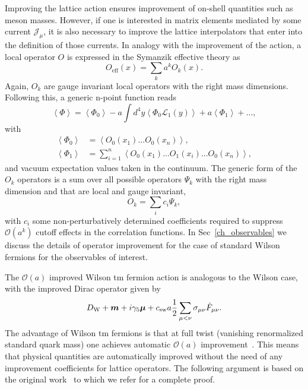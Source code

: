 Improving the lattice action ensures improvement of on-shell quantities such as meson masses. However, if one is interested in matrix elements mediated by some current $\mathcal{J}_{\mu}$, it is also necessary to improve the lattice interpolators that enter into the definition of those currents. In analogy with the improvement of the action, a local operator $O$ is expressed in the Symanzik effective theory as
\begin{equation}
O_{\textrm{eff}}(x)=\sum_ka^kO_k(x).
\end{equation}
Again, $O_k$ are gauge invariant local operators with the right mass dimensions. Following this, a generic n-point function reads
\begin{equation}
\label{ch_foundation:eq:Oimpr}
\left<\Phi\right>=\left<\Phi_0\right>-a\int d^4y\left<\Phi_0\mathcal{L}_1(y)\right>+a\left<\Phi_1\right>+...,
\end{equation}
with 
\begin{align}
\left<\Phi_0\right>&=\left<O_0(x_1)...O_0(x_n)\right>, \\
\left<\Phi_1\right>&=\sum_{i=1}^n\left<O_0(x_1)...O_1(x_i)...O_0(x_n)\right>,
\end{align}
and vacuum expectation values taken in the continuum. The generic form of the $O_k$ operators is a sum over all possible operators $\Psi_k$ with the right mass dimension and that are local and gauge invariant,
\begin{equation}
O_k=\sum_ic_i\Psi_k,
\end{equation}
with $c_i$ some non-perturbatively determined coefficients required to suppress $\mathcal{O}(a^k)$ cutoff effects in the correlation functions. In Sec~\ref{ch_observables} we discuss the details of operator improvement for the case of standard Wilson fermions for the observables of interest.

The $\mathcal{O}(a)$ improved Wilson tm fermion action is analogous to the Wilson case, with the improved Dirac operator given by 
\begin{equation}
D_{\textrm W}+\boldsymbol{m}+i\gamma_5\boldsymbol{\mu}+c_{\textrm{sw}}a\frac{1}{2}\sum_{\mu<\nu}\sigma_{\mu\nu}\hat{F}_{\mu\nu}.
\end{equation}
The advantage of Wilson tm fermions is that at full twist (vanishing renormalized standard quark mass) one achieves automatic $\mathcal{O}(a)$ improvement~\cite{}. This means that physical quantities are automatically improved without the need of any improvement coefficients for lattice operators. The following argument is based on the original work~\cite{} to which we refer for a complete proof.

